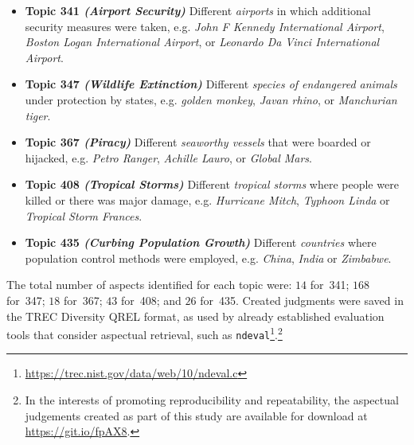 \begin{itemize}
    \item{\textbf{Topic 341 \emph{(Airport Security)}} Different \emph{airports} in which additional security measures were taken, e.g. \emph{John F Kennedy International Airport}, \emph{Boston Logan International Airport}, or \emph{Leonardo Da Vinci International Airport}.}
    \item{\textbf{Topic 347 \emph{(Wildlife Extinction)}} Different \emph{species of endangered animals} under protection by states, e.g. \emph{golden monkey}, \emph{Javan rhino}, or \emph{Manchurian tiger}.}
    \item{\textbf{Topic 367 \emph{(Piracy)}} Different \emph{seaworthy vessels} that were boarded or hijacked, e.g. \emph{Petro Ranger}, \emph{Achille Lauro}, or \emph{Global Mars}.}
    \item{\textbf{Topic 408 \emph{(Tropical Storms)}} Different \emph{tropical storms} where people were killed or there was major damage, e.g. \emph{Hurricane Mitch}, \emph{Typhoon Linda} or \emph{Tropical Storm Frances}.}
    \item{\textbf{Topic 435 \emph{(Curbing Population Growth)}} Different \emph{countries} where population control methods were employed, e.g. \emph{China}, \emph{India} or \emph{Zimbabwe}.}
\end{itemize}

The total number of aspects identified for each topic were: $14$ for~341; $168$ for~347; $18$ for~367; $43$ for~408; and $26$ for~435. Created judgments were saved in the TREC Diversity QREL format, as used by already established evaluation tools that consider aspectual retrieval, such as \texttt{ndeval}\footnote{\url{https://trec.nist.gov/data/web/10/ndeval.c}}.\footnote{In the interests of promoting reproducibility and repeatability, the aspectual judgements created as part of this study are available for download at \url{https://git.io/fpAX8}.} %



